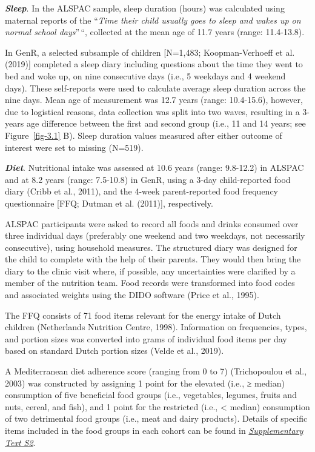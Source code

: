 \documentclass[
  letterpaper,
  DIV=11,
  numbers=noendperiod]{scrreport}
\begin{document}
\textbf{\emph{Sleep}}. In the ALSPAC sample, sleep duration (hours) was
calculated using maternal reports of the ``\emph{Time their child
usually goes to sleep and wakes up on normal school days}''\,``,
collected at the mean age of 11.7 years (range: 11.4-13.8).

In GenR, a selected subsample of children {[}N=1,483; Koopman-Verhoeff
et al. (2019){]} completed a sleep diary including questions about the
time they went to bed and woke up, on nine consecutive days (i.e., 5
weekdays and 4 weekend days). These self-reports were used to calculate
average sleep duration across the nine days. Mean age of measurement was
12.7 years (range: 10.4-15.6), however, due to logistical reasons, data
collection was split into two waves, resulting in a 3-years age
difference between the first and second group (i.e., 11 and 14 years;
see Figure~\ref{fig-3.1} B). Sleep duration values measured after either
outcome of interest were set to missing (N=519).

\textbf{\emph{Diet}}. Nutritional intake was assessed at 10.6 years
(range: 9.8-12.2) in ALSPAC and at 8.2 years (range: 7.5-10.8) in GenR,
using a 3-day child-reported food diary (Cribb et al., 2011), and the
4-week parent-reported food frequency questionnaire {[}FFQ; Dutman et
al. (2011){]}, respectively.

ALSPAC participants were asked to record all foods and drinks consumed
over three individual days (preferably one weekend and two weekdays, not
necessarily consecutive), using household measures. The structured diary
was designed for the child to complete with the help of their parents.
They would then bring the diary to the clinic visit where, if possible,
any uncertainties were clarified by a member of the nutrition team. Food
records were transformed into food codes and associated weights using
the DIDO software (Price et al., 1995).

The FFQ consists of 71 food items relevant for the energy intake of
Dutch children (Netherlands Nutrition Centre, 1998). Information on
frequencies, types, and portion sizes was converted into grams of
individual food items per day based on standard Dutch portion sizes
(Velde et al., 2019).

A Mediterranean diet adherence score (ranging from 0 to 7) (Trichopoulou
et al., 2003) was constructed by assigning 1 point for the elevated
(i.e., ≥ median) consumption of five beneficial food groups (i.e.,
vegetables, legumes, fruits and nuts, cereal, and fish), and 1 point for
the restricted (i.e., \textless{} median) consumption of two detrimental
food groups (i.e., meat and dairy products). Details of specific items
included in the food groups in each cohort can be found in
\href{https://osf.io/9vky4}{\emph{Supplementary Text S2}}.
\end{document}
